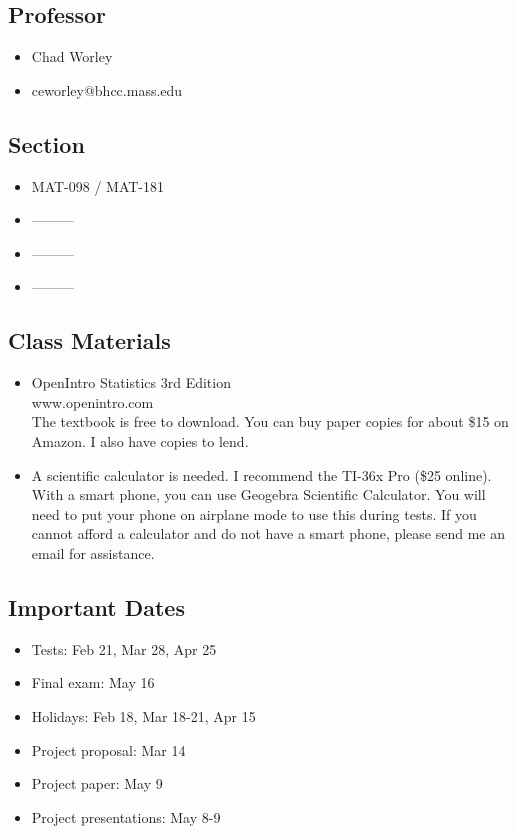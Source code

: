 \documentclass[12pt,letterpaper]{article}
\begin{document}
\subsection*{Professor}
\begin{itemize}
\item Chad Worley 
\item ceworley@bhcc.mass.edu
\end{itemize}
\subsection*{Section}
\begin{itemize}
\item MAT-098 / MAT-181
\item ---------
\item ---------
\item ---------
\end{itemize}


\subsection*{Class Materials}
\begin{itemize}
\item OpenIntro Statistics 3rd Edition
\\ www.openintro.com
\\ The textbook is free to download. You can buy paper copies for about \$15 on Amazon. I also have copies to lend.
\item A scientific calculator is needed. I recommend the TI-36x Pro (\$25 online). With a smart phone, you can use Geogebra Scientific Calculator. You will need to put your phone on airplane mode to use this during tests. If you cannot afford a calculator and do not have a smart phone, please send me an email for assistance.
\end{itemize}

\subsection*{Important Dates}
\begin{itemize}
\item Tests: Feb 21, Mar 28, Apr 25
\item Final exam: May 16
\item Holidays: Feb 18, Mar 18-21, Apr 15
\item Project proposal: Mar 14
\item Project paper: May 9
\item Project presentations: May 8-9
\end{itemize}
\end{document}

